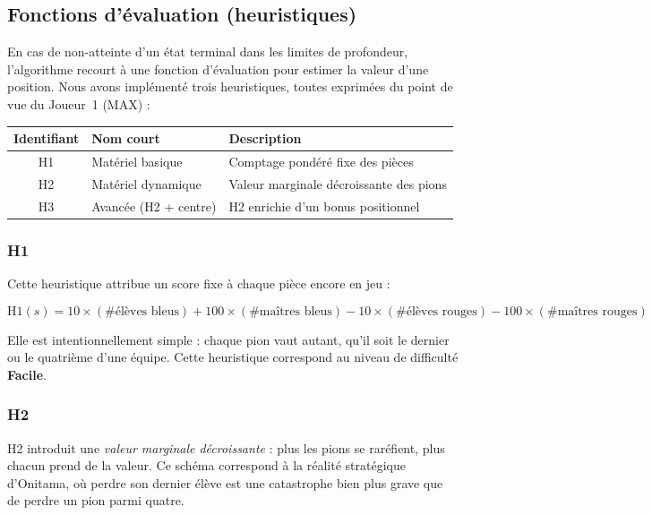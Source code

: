 \documentclass[12pt, a4paper]{article}
\begin{document}
\subsection{Fonctions d'évaluation (heuristiques)}
\label{sec:heuristiques}

En cas de non-atteinte d'un état terminal dans les limites de profondeur, l'algorithme recourt
à une fonction d'évaluation pour estimer la valeur d'une position. Nous avons implémenté trois
heuristiques, toutes exprimées du point de vue du Joueur~1 (MAX) :

\medskip
\begin{center}
\begin{tabular}{clp{7cm}}
  \toprule
  Identifiant & Nom court & Description \\
  \midrule
  H1 & Matériel basique & Comptage pondéré fixe des pièces \\
  H2 & Matériel dynamique & Valeur marginale décroissante des pions \\
  H3 & Avancée (H2 + centre) & H2 enrichie d'un bonus positionnel \\
  \bottomrule
\end{tabular}
\end{center}

\subsubsection{H1}

Cette heuristique attribue un score fixe à chaque pièce encore en jeu :

\begin{equation}
  \text{H1}(s) = 10 \times (\#\text{élèves bleus}) + 100 \times (\#\text{maîtres bleus})
                 - 10 \times (\#\text{élèves rouges}) - 100 \times (\#\text{maîtres rouges})
\end{equation}

Elle est intentionnellement simple : chaque pion vaut autant, qu'il soit le dernier ou le
quatrième d'une équipe. Cette heuristique correspond au niveau de difficulté \textbf{Facile}.

\subsubsection{H2}

H2 introduit une \textit{valeur marginale décroissante} : plus les pions se raréfient, plus
chacun prend de la valeur. Ce schéma correspond à la réalité stratégique d'Onitama, où perdre
son dernier élève est une catastrophe bien plus grave que de perdre un pion parmi quatre.
\end{document}
